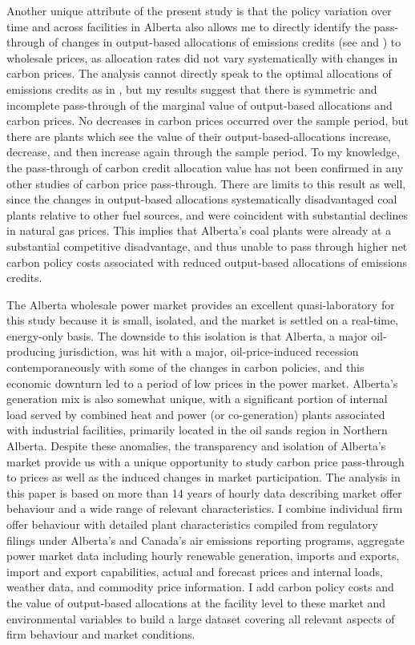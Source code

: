 \documentclass[12pt]{article}
\begin{document}
Another unique attribute of the present study is that the policy variation over time and across facilities in Alberta also allows me to directly identify the pass-through of changes in output-based allocations of emissions credits (see \cite{fischerfox07} and \cite{fischerfox12}) to wholesale prices, as allocation rates did not vary systematically with changes in carbon prices. The analysis cannot directly speak to the optimal allocations of emissions credits as in \cite{burtraw_palmer_2008}, but my results suggest that there is symmetric and incomplete pass-through of the marginal value of output-based allocations and carbon prices. No decreases in carbon prices occurred over the sample period, but there are plants which see the value of their output-based-allocations increase, decrease, and then increase again through the sample period. To my knowledge, the pass-through of carbon credit allocation value has not been confirmed in any other studies of carbon price pass-through. There are limits to this result as well, since the changes in output-based allocations systematically disadvantaged coal plants relative to other fuel sources, and were coincident with substantial declines in natural gas prices. This implies that Alberta's coal plants were already at a substantial competitive disadvantage, and thus unable to pass through higher net carbon policy costs associated with reduced output-based allocations of emissions credits.

The Alberta wholesale power market provides an excellent quasi-laboratory for this study because it is small, isolated, and the market is settled on a real-time, energy-only basis. The downside to this isolation is that Alberta, a major oil-producing jurisdiction, was hit with a major, oil-price-induced recession contemporaneously with some of the changes in carbon policies, and this economic downturn led to a period of low prices in the power market. Alberta's generation mix is also somewhat unique, with a significant portion of internal load served by combined heat and power (or co-generation) plants associated with industrial facilities, primarily located in the oil sands region in Northern Alberta. Despite these anomalies, the transparency and isolation of Alberta's market provide us with a unique opportunity to study carbon price pass-through to prices as well as the induced changes in market participation. The analysis in this paper is based on more than 14 years of hourly data describing market offer behaviour and a wide range of relevant characteristics. I combine individual firm offer behaviour with detailed plant characteristics compiled from regulatory filings under Alberta's and Canada's air emissions reporting programs, aggregate power market data including hourly renewable generation, imports and exports, import and export capabilities, actual and forecast prices and internal loads, weather data, and commodity price information. I add carbon policy costs and the value of output-based allocations at the facility level to these market and environmental variables to build a large dataset covering all relevant aspects of firm behaviour and market conditions.
\end{document}
